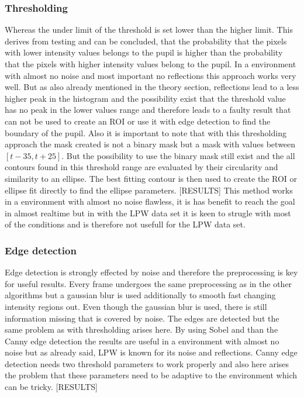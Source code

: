\subsubsection{Thresholding}
Whereas the under limit of the threshold is set lower than the higher limit. This derives from testing and can be concluded, that the probability that the pixels with lower intensity values belongs to the pupil is higher than the probability that the pixels with higher intensity values belong to the pupil. In a environment with almost no noise and most important no reflections this approach works very well. But as also already mentioned in the theory section, reflections lead to a less higher peak in the histogram and the possibility exist that the threshold value has no peak in the lower values range and therefore leads to a faulty result that can not be used to create an ROI or use it with edge detection to find the boundary of the pupil. Also it is important to note that with this thresholding approach the mask created is not a binary mask but a mask with values between $[t-35, t+25]$. But the possibility to use the binary mask still exist and the all contours found in this threshold range are evaluated by their circularity and similarity to an ellipse. The best fitting contour is then used to create the ROI or ellipse fit directly to find the ellipse parameters. 
[RESULTS]
This method works in a environment with almost no noise flawless, it is has benefit to reach the goal in almost realtime but in with the LPW data set it is keen to strugle with most of the conditions and is therefore not usefull for the LPW data set.

\subsubsection{Edge detection}
Edge detection is strongly effected by noise and therefore the preprocessing is key for useful results. Every frame undergoes the same preprocessing as in the other algorithms but a gaussian blur is used additionally to smooth fast changing intensity regions out.  Even though the gaussian blur is used, there is still information missing that is covered by noise. The edges are detected but the same problem as with thresholding arises here. By using Sobel and than the Canny edge detection the results are useful in a environment with almost no noise but as already said, LPW is known for its noise and reflections. Canny edge detection needs two threshold parameters to work properly and also here arises the problem that these parameters need to be adaptive to the environment which can be tricky. 
[RESULTS]

